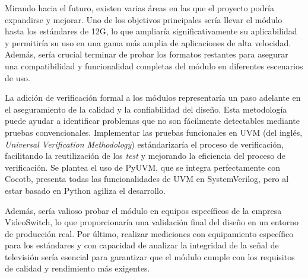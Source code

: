 Mirando hacia el futuro, existen varias áreas en las que el proyecto podría
expandirse y mejorar. Uno de los objetivos principales sería llevar el módulo
hasta los estándares de 12G, lo que ampliaría significativamente su aplicabilidad
y permitiría su uso en una gama más amplia de aplicaciones de alta velocidad.
Además, sería crucial terminar de probar los formatos restantes para asegurar
una compatibilidad y funcionalidad completas del módulo en diferentes escenarios
de uso.

La adición de verificación formal a los módulos representaría un paso adelante
en el aseguramiento de la calidad y la confiabilidad del diseño. Esta
metodología puede ayudar a identificar problemas que no son fácilmente
detectables mediante pruebas convencionales. Implementar las pruebas funcionales
en UVM (del inglés, \textit{Universal Verification Methodology}) estándarizaría el
proceso de verificación, facilitando la reutilización de los \textit{test} y
mejorando la eficiencia del proceso de verificación. Se plantea el uso de PyUVM,
que se integra perfectamente con Cocotb, presenta todas las funcionalidades de
UVM en SystemVerilog, pero al estar basado en Python agiliza el desarrollo.

Además, sería valioso probar el módulo en equipos específicos de la empresa
VideoSwitch, lo que proporcionaría una validación final del diseño en un entorno
de producción real. Por último, realizar mediciones con equipamiento específico
para los estándares y con capacidad de analizar la integridad de la señal de
televisión sería esencial para garantizar que el módulo cumple con los requisitos
de calidad y rendimiento más exigentes.
